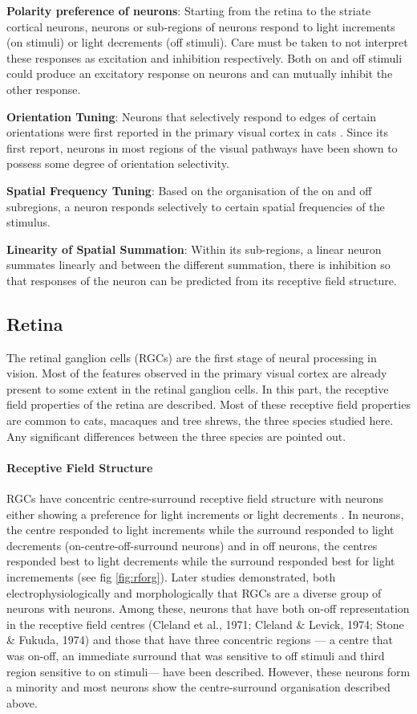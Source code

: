 \textbf{Polarity preference of neurons}: Starting from the retina to the striate cortical neurons, neurons or sub-regions of neurons respond to light increments (on stimuli) or light decrements (off stimuli). Care must be taken to not interpret these responses as excitation and inhibition respectively. Both on and off stimuli could produce an excitatory response on neurons and can mutually inhibit the other response.

\textbf{Orientation Tuning}: Neurons that selectively respond to edges of certain orientations were first reported in the primary visual cortex in cats \cite{Hubel1962d}. Since its first report, neurons in most regions of the visual pathways have been shown to possess some degree of orientation selectivity.

\textbf{Spatial Frequency Tuning}: Based on the organisation of the on and off subregions, a neuron responds selectively to certain spatial frequencies of the stimulus.

\textbf{Linearity of Spatial Summation}: Within its sub-regions, a linear neuron summates linearly and between the different summation, there is inhibition so that responses of the neuron can be predicted from its receptive field structure.

\subsection{Retina}

The retinal ganglion cells (RGCs) are  the first stage of neural processing in vision. Most of the features observed in the primary visual cortex are already present to some extent in the retinal ganglion cells. In this part, the receptive field properties of the retina are described. Most of these receptive field properties are common to cats, macaques and tree shrews, the three species studied here. Any significant differences between the three species are pointed out.

\paragraph{Receptive Field Structure}

RGCs have concentric centre-surround receptive field structure with neurons either showing a preference for light increments or light decrements \cite{Kuffler1951}. In neurons, the centre responded to light increments while the surround responded to light decrements (on-centre-off-surround neurons) and in off neurons, the centres responded best to light decrements while the surround responded best for light incremements (see fig \ref{fig:rforg}). Later studies demonstrated,  both electrophysiologically and morphologically that RGCs are a diverse group of neurons with neurons. Among these, neurons that have both on-off representation in the receptive field centres (Cleland et al., 1971; Cleland \& Levick, 1974; Stone \& Fukuda, 1974) and those that have three concentric regions --- a centre that was on-off, an immediate surround that was sensitive to off stimuli and third region sensitive to on stimuli--- have been described. However, these neurons form a minority and most neurons show the centre-surround organisation described above.

